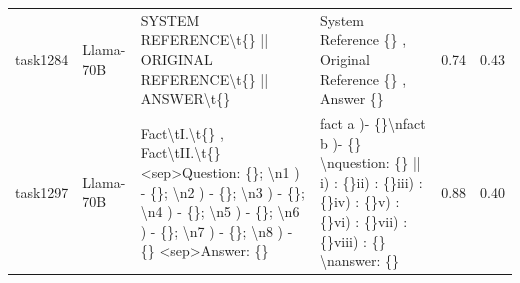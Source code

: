 \begin{longtable}{@{}p{0.8cm\tiny}p{1cm\tiny}p{4.1cm\ttfamily\tiny}p{4.1cm\ttfamily\tiny}p{0.8cm\tiny}p{0.8cm\tiny}@{}}
task1284  & Llama-70B  & SYSTEM REFERENCE\textbackslash{}t\{\} || ORIGINAL REFERENCE\textbackslash{}t\{\} || ANSWER\textbackslash{}t\{\}                                                                                                                                                                                                                                                                                                                                                                                                         & System Reference \{\} ,  Original Reference \{\} ,  Answer \{\}                                                                                                                                                                                                                                                                                                                                                                                                                                                                                                                   & 0.74 & 0.43 \\
task1297  & Llama-70B  & Fact\textbackslash{}tI.\textbackslash{}t\{\} ,  Fact\textbackslash{}tII.\textbackslash{}t\{\} \textless{}sep\textgreater Question: \{\}; \textbackslash{}n1 ) - \{\}; \textbackslash{}n2 ) - \{\}; \textbackslash{}n3 ) - \{\}; \textbackslash{}n4 ) - \{\}; \textbackslash{}n5 ) - \{\}; \textbackslash{}n6 ) - \{\}; \textbackslash{}n7 ) - \{\}; \textbackslash{}n8 ) - \{\} \textless{}sep\textgreater Answer: \{\}                                                                                                 & fact  a )- \{\}\textbackslash{}nfact  b )- \{\} \textbackslash{}nquestion: \{\} || i) : \{\}ii) : \{\}iii) : \{\}iv) : \{\}v) : \{\}vi) : \{\}vii) : \{\}viii) : \{\} \textbackslash{}nanswer: \{\}                                                                                                                                                                                                                                                                                                                                                                               & 0.88 & 0.40 \\

\end{longtable}
